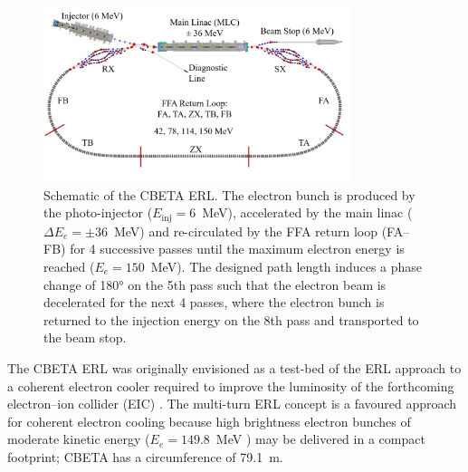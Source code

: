 \documentclass[../main.tex]{subfiles}
\begin{document}
\begin{figure}[!h]
\centering
\includegraphics[width=0.8\textwidth]{Figures/CBETA_Multi-Pass_Commissioning/CBETA_4turn.pdf}
\caption{Schematic of the CBETA ERL. The electron bunch is produced by the photo-injector ($E_{\mathrm{inj}} = 6$~\si{\mega\electronvolt}), accelerated by the main linac ($\Delta E_{e} = \pm 36$~\si{\mega\electronvolt}) and re-circulated by the FFA return loop (FA--FB) for 4 successive passes until the maximum electron energy is reached ($E_{e} = 150$~\si{\mega\electronvolt}). The designed path length induces a phase change of 180\si{\degree} on the 5th pass such that the electron beam is decelerated for the next 4 passes, where the electron bunch is returned to the injection energy on the 8th pass and transported to the beam stop.}
\label{fig:CBETA_layout}
\end{figure}

The CBETA ERL was originally envisioned as a test-bed of the ERL approach to a coherent electron cooler \cite{derbenev1991coherent,litvinenko2009coherent} required to improve the luminosity of the forthcoming electron--ion collider (EIC) \cite{willeke2021electron}. The multi-turn ERL concept is a favoured approach for coherent electron cooling because high brightness electron bunches of moderate kinetic energy ($E_{e} = 149.8$~\si{\mega\electronvolt} \cite{willeke2021electron}) may be delivered in a compact footprint; CBETA has a circumference of 79.1~\si{\meter}. 
\end{document}

